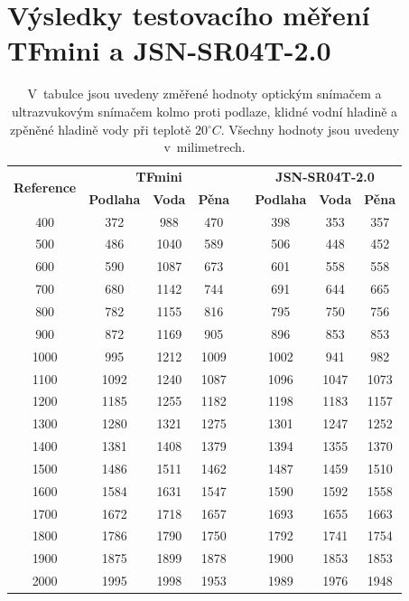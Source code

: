 \chapter{Výsledky testovacího měření TFmini a JSN-SR04T-2.0}
	\label{sec:values}
	\begin{table}[h]\centering
        \begin{tabular}{@{}cccccccc@{}}
            \toprule
            \multirow{2}{*}{\textbf{Reference}} & \multicolumn{3}{c}{\textbf{TFmini}} && \multicolumn{3}{c}{\textbf{JSN-SR04T-2.0}}\\ 
            \cmidrule{2-4}\cmidrule{6-8}
            	& \textbf{Podlaha}    & \textbf{Voda}      & \textbf{Pěna}&& \textbf{Podlaha}    & \textbf{Voda}      & \textbf{Pěna}\\
            \midrule
            400		& 372	& 988	& 470	&& 398	& 353	& 357	\\ 
            500		& 486	& 1040	& 589	&& 506	& 448	& 452	\\ 
            600		& 590	& 1087	& 673	&& 601	& 558	& 558	\\ 
            700		& 680	& 1142	& 744	&& 691	& 644	& 665	\\ 
            800		& 782	& 1155	& 816	&& 795	& 750	& 756	\\ 
            900		& 872	& 1169	& 905	&& 896	& 853	& 853	\\ 
            1000	& 995	& 1212	& 1009	&& 1002	& 941	& 982	\\ 
            1100	& 1092	& 1240	& 1087	&& 1096	& 1047	& 1073	\\
            1200	& 1185	& 1255	& 1182	&& 1198	& 1183	& 1157	\\ 
            1300	& 1280	& 1321	& 1275	&& 1301	& 1247	& 1252	\\ 
            1400	& 1381	& 1408	& 1379	&& 1394	& 1355	& 1370	\\ 
            1500	& 1486	& 1511	& 1462	&& 1487	& 1459	& 1510	\\ 
            1600	& 1584	& 1631	& 1547	&& 1590	& 1592	& 1558	\\ 
            1700	& 1672	& 1718	& 1657	&& 1693	& 1655	& 1663	\\ 
            1800	& 1786	& 1790	& 1750	&& 1792	& 1741	& 1754	\\ 
            1900	& 1875	& 1899	& 1878	&& 1900	& 1853	& 1853	\\ 
            2000	& 1995	& 1998	& 1953	&& 1989	& 1976	& 1948	\\ 
            \bottomrule
        \end{tabular}
        \caption{V~tabulce jsou uvedeny změřené hodnoty optickým snímačem  a ultrazvukovým snímačem  kolmo proti podlaze, klidné vodní hladině a zpěněné hladině vody při teplotě $20\unit{^\circ C}$. Všechny hodnoty jsou uvedeny v~milimetrech.}
    \end{table}

